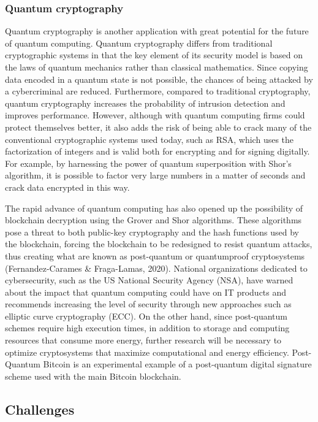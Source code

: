 \documentclass[
  letterpaper,
  DIV=11,
  numbers=noendperiod]{scrreprt}
\begin{document}
\hypertarget{quantum-cryptography}{%
\subsubsection{Quantum cryptography}\label{quantum-cryptography}}

Quantum cryptography is another application with great potential for the
future of quantum computing. Quantum cryptography differs from
traditional cryptographic systems in that the key element of its
security model is based on the laws of quantum mechanics rather than
classical mathematics. Since copying data encoded in a quantum state is
not possible, the chances of being attacked by a cybercriminal are
reduced. Furthermore, compared to traditional cryptography, quantum
cryptography increases the probability of intrusion detection and
improves performance. However, although with quantum computing firms
could protect themselves better, it also adds the risk of being able to
crack many of the conventional cryptographic systems used today, such as
RSA, which uses the factorization of integers and is valid both for
encrypting and for signing digitally. For example, by harnessing the
power of quantum superposition with Shor's algorithm, it is possible to
factor very large numbers in a matter of seconds and crack data
encrypted in this way.

The rapid advance of quantum computing has also opened up the
possibility of blockchain decryption using the Grover and Shor
algorithms. These algorithms pose a threat to both public-key
cryptography and the hash functions used by the blockchain, forcing the
blockchain to be redesigned to resist quantum attacks, thus creating
what are known as post-quantum or quantumproof cryptosystems
(Fernandez-Carames \& Fraga-Lamas, 2020). National organizations
dedicated to cybersecurity, such as the US National Security Agency
(NSA), have warned about the impact that quantum computing could have on
IT products and recommends increasing the level of security through new
approaches such as elliptic curve cryptography (ECC). On the other hand,
since post-quantum schemes require high execution times, in addition to
storage and computing resources that consume more energy, further
research will be necessary to optimize cryptosystems that maximize
computational and energy efficiency. Post-Quantum Bitcoin is an
experimental example of a post-quantum digital signature scheme used
with the main Bitcoin blockchain.

\hypertarget{challenges-4}{%
\subsection{Challenges}\label{challenges-4}}
\end{document}
